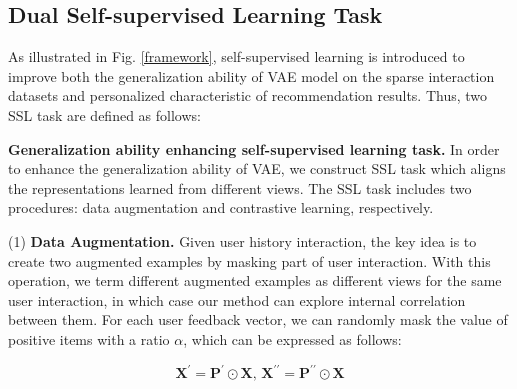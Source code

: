                  
           

\subsection{Dual Self-supervised Learning Task}\label{23-}
As illustrated in Fig. \ref{framework}, self-supervised learning is introduced to improve both the generalization ability of VAE model on the sparse interaction datasets and personalized characteristic of recommendation results. Thus, two SSL task are defined as follows: %



\textbf{Generalization ability enhancing self-supervised learning task.}\label{231}  
In order to enhance the generalization ability of VAE, we construct SSL task which aligns the representations learned from different views. The SSL task includes two procedures: data augmentation and contrastive learning, respectively.




(1) \textbf{Data Augmentation.} Given user history interaction, the key idea is to create two augmented examples by masking part of user interaction. With this operation, we term different augmented examples as different views for the same user interaction, in which case our method can explore internal correlation between them. For each user feedback vector, we can randomly mask the value of positive items with a ratio $\alpha$, which can be expressed as follows:

\begin{equation}
\mathbf{X^{\prime}} = \mathbf{P^{\prime}} \odot \mathbf{X}\text{,  } \mathbf{X^{\prime\prime}} = \mathbf{P^{\prime\prime}} \odot \mathbf{X}
\label{eq6}
\end{equation}

